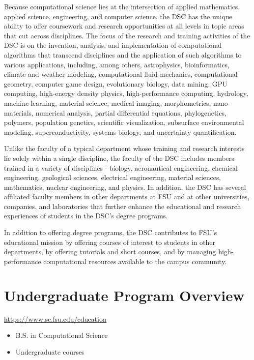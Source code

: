 \documentclass[12pt,a4paper]{article}
\begin{document}
Because computational science lies at the intersection of applied mathematics, applied science, engineering, and computer science, the DSC has the unique ability to offer coursework and research opportunities at all levels in topic areas that cut across disciplines. The focus of the research and training activities of the DSC is on the invention, analysis, and implementation of computational algorithms that transcend disciplines and the application of such algorithms to various applications, including, among others, astrophysics, bioinformatics, climate and weather modeling, computational fluid mechanics, computational geometry, computer game design, evolutionary biology, data mining, GPU computing, high-energy density physics, high-performance computing, hydrology, machine learning, material science, medical imaging, morphometrics, nano-materials, numerical analysis, partial differential equations, phylogenetics, polymers, population genetics, scientific visualization, subsurface environmental modeling, superconductivity, systems biology, and uncertainty quantification.

Unlike the faculty of a typical department whose training and research interests lie solely within a single discipline, the faculty of the DSC includes members trained in a variety of disciplines - biology, aeronautical engineering, chemical engineering, geological sciences, electrical engineering, material sciences, mathematics, nuclear engineering, and physics. In addition, the DSC has several affiliated faculty members in other departments at FSU and at other universities, companies, and laboratories that further enhance the educational and research experiences of students in the DSC's degree programs.

In addition to offering degree programs, the DSC contributes to FSU's educational mission by offering courses of interest to students in other departments, by offering tutorials and short courses, and by managing high-performance computational resources available to the campus community.

\section{Undergraduate Program Overview}
\url{https://www.sc.fsu.edu/education}
\begin{itemize}
    \item B.S. in Computational Science
    \item Undergraduate courses
\end{itemize}
\end{document}
